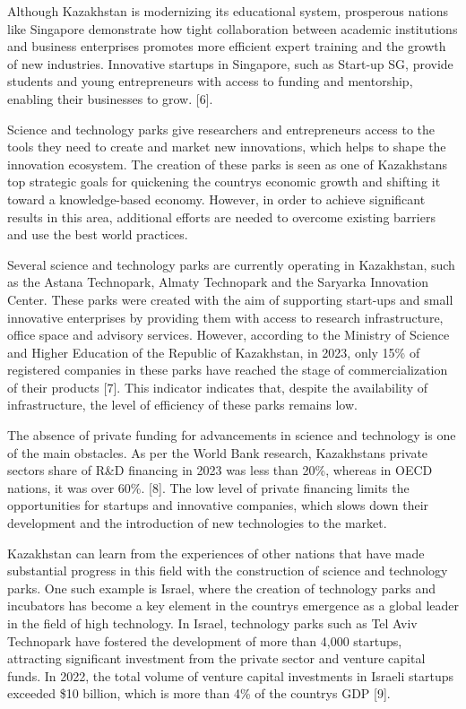 \begin{multicols}{2}
Although Kazakhstan is modernizing its educational system, prosperous
nations like Singapore demonstrate how tight collaboration between
academic institutions and business enterprises promotes more efficient
expert training and the growth of new industries. Innovative startups in
Singapore, such as Start-up SG, provide students and young entrepreneurs
with access to funding and mentorship, enabling their businesses to
grow. {[}6{]}.

Science and technology parks give researchers and entrepreneurs access
to the tools they need to create and market new innovations, which helps
to shape the innovation ecosystem. The creation of these parks is seen
as one of Kazakhstan\textquotesingle s top strategic goals for
quickening the country\textquotesingle s economic growth and shifting it
toward a knowledge-based economy. However, in order to achieve
significant results in this area, additional efforts are needed to
overcome existing barriers and use the best world practices.

Several science and technology parks are currently operating in
Kazakhstan, such as the Astana Technopark, Almaty Technopark and the
Saryarka Innovation Center. These parks were created with the aim of
supporting start-ups and small innovative enterprises by providing them
with access to research infrastructure, office space and advisory
services. However, according to the Ministry of Science and Higher
Education of the Republic of Kazakhstan, in 2023, only 15\% of
registered companies in these parks have reached the stage of
commercialization of their products {[}7{]}. This indicator indicates
that, despite the availability of infrastructure, the level of
efficiency of these parks remains low.

The absence of private funding for advancements in science and
technology is one of the main obstacles. As per the World Bank research,
Kazakhstan\textquotesingle s private sector\textquotesingle s share of
R\&D financing in 2023 was less than 20\%, whereas in OECD nations, it
was over 60\%. {[}8{]}. The low level of private financing limits the
opportunities for startups and innovative companies, which slows down
their development and the introduction of new technologies to the
market.

Kazakhstan can learn from the experiences of other nations that have
made substantial progress in this field with the construction of science
and technology parks. One such example is Israel, where the creation of
technology parks and incubators has become a key element in the
country\textquotesingle s emergence as a global leader in the field of
high technology. In Israel, technology parks such as Tel Aviv Technopark
have fostered the development of more than 4,000 startups, attracting
significant investment from the private sector and venture capital
funds. In 2022, the total volume of venture capital investments in
Israeli startups exceeded \$10 billion, which is more than 4\% of the
country\textquotesingle s GDP {[}9{]}.


\end{multicols}
